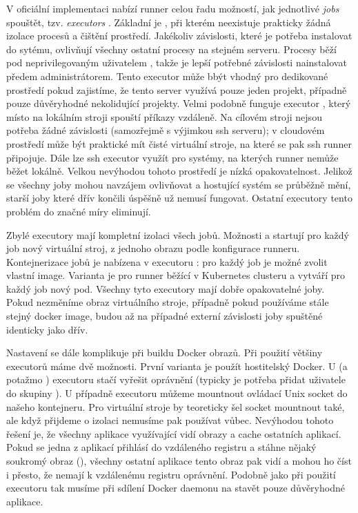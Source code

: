         V oficiální implementaci nabízí runner celou řadu možností, jak jednotlivé \textit{jobs} spouštět, tzv. \textit{executors} \cite{gitlab-runner-config}. Základní je , při kterém neexistuje prakticky žádná izolace procesů a čištění prostředí. Jakékoliv závislosti, které je potřeba instalovat do sytému, ovlivňují všechny ostatní procesy na stejném serveru. Procesy běží pod neprivilegovaným uživatelem , takže je lepší potřebné závislosti nainstalovat předem administrátorem. Tento executor může bbýt vhodný pro dedikované prostředí pokud zajistíme, že tento server využívá pouze jeden projekt, případně pouze důvěryhodné nekolidující projekty. Velmi podobně funguje executor , který místo na lokálním stroji spouští příkazy vzdáleně. Na cílovém stroji nejsou potřeba žádné závislosti (samozřejmě s výjimkou ssh serveru); v cloudovém prostředí může být praktické mít čisté virtuální stroje, na které se pak ssh runner připojuje. Dále lze ssh executor využít pro systémy, na kterých runner nemůže běžet lokálně. Velkou nevýhodou tohoto prostředí je nízká opakovatelnost. Jelikož se všechny joby mohou navzájem ovlivňovat a hostující systém se průběžně mění, starší joby které dřív končili úspěšně už nemusí fungovat. Ostatní executory tento problém do značné míry eliminují.

        Zbylé executory mají kompletní izolaci všech jobů. Možnosti  a  startují pro každý job nový virtuální stroj, z jednoho obrazu podle konfigurace runneru. Kontejnerizace jobů je nabízena v executoru : pro každý job je možné zvolit vlastní image. Varianta  je pro runner běžící v Kubernetes clusteru a vytváří pro každý job nový pod. Všechny tyto executory mají dobře opakovatelné joby. Pokud nezměníme obraz virtuálního stroje, případně pokud používáme stále stejný docker image, budou až na případné externí závislosti joby spuštěné identicky jako dřív.

        \label{sec:gitlab-ci-docker}
        Nastavení \CI se dále komplikuje při buildu Docker obrazů. Při použití většiny executorů máme dvě možnosti. První varianta je použít hostitelský Docker. U  (a potažmo ) executoru stačí vyřešit oprávnění (typicky je potřeba přidat uživatele  do skupiny ). U  případně  executoru můžeme mountnout ovládací Unix socket  do našeho kontejneru. Pro virtuální stroje by teoreticky šel socket mountnout také, ale když přijdeme o izolaci nemusíme pak  používat vůbec. Nevýhodou tohoto řešení je, že všechny aplikace využívající \CI vidí obrazy a cache ostatních aplikací. Pokud se jedna z aplikací přihlásí do vzdáleného registru a stáhne nějaký soukromý obraz (), všechny ostatní aplikace tento obraz pak vidí a mohou ho číst i přesto, že nemají k vzdálenému registru oprávnění. Podobně jako při použití  executoru tak musíme při sdílení Docker daemonu na \CI stavět pouze důvěryhodné aplikace.


